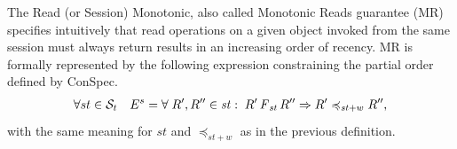 \documentclass[journal,compsoc]{IEEEtran}
\begin{document}
\par The Read (or Session) Monotonic, also called Monotonic Reads guarantee (MR) specifies intuitively that read operations on a given object invoked from the same session must always return results in an increasing order of recency.   MR is formally represented by the following expression constraining the partial order defined by ConSpec.
\begin{align}\label{eqn:MR}
\begin{split}
 \forall st \in \mathcal{S}_t \quad E^{s} = \forall \;  {R}', {R}'' \in \mathit{st} : \; {R}' \operatorname{\it F}_\mathit{st} {R}''
 \Rightarrow {R}' \preccurlyeq_{\mathit{st}+w} {R}'' , 
\end{split}
\end{align} with the same meaning for $\mathit{st}$ and $\preccurlyeq_{\mathit{st}+w}$ as in the previous definition.
\end{document}
